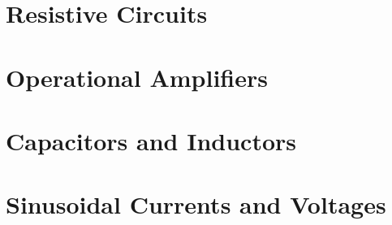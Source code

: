 \documentclass[14pt]{article}
\begin{document}
    \section{Resistive Circuits}
    \section{Operational Amplifiers}
    \section{Capacitors and Inductors}
    \section{Sinusoidal Currents and Voltages}  
\end{document}
